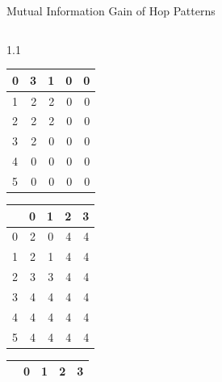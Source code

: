 \begin{alertblock}{Mutual Information Gain of Hop Patterns}
{\begin{column}{1.1\colwidth}
\begin{table}[]
\begin{subtable}{0.3\textwidth}
\begin{tabular}{|l|r|r|r|r|}
\hline
0 & \cellcolor{purple}3 & \cellcolor{white}1 & \cellcolor{gray}0 & \cellcolor{gray}0 \\ \hline
1 & \cellcolor{violet}2 & \cellcolor{violet}2 & \cellcolor{gray}0 & \cellcolor{gray}0 \\ \hline
2 & \cellcolor{violet}2 & \cellcolor{violet}2 & \cellcolor{gray}0 & \cellcolor{gray}0 \\ \hline
3 & \cellcolor{violet}2 & \cellcolor{gray}0 & \cellcolor{gray}0 & \cellcolor{gray}0 \\ \hline
4 & \cellcolor{gray}0 & \cellcolor{gray}0 & \cellcolor{gray}0 & \cellcolor{gray}0 \\ \hline
5 & \cellcolor{gray}0 & \cellcolor{gray}0 & \cellcolor{gray}0 & \cellcolor{gray}0 \\ \hline
\end{tabular}
\end{subtable}
\quad
\begin{subtable}{0.3\textwidth}
\centering
\begin{tabular}{|l|r|r|r|r|} 
\hline
\backslashbox{$\alpha$}{$\beta$} & 0 & 1 & 2 & 3  \\ 
\hline
0 & \cellcolor{purple}2 & \cellcolor{white}0 & \cellcolor{gray}4 & \cellcolor{gray}4 \\ \hline
1 & \cellcolor{purple}2 & \cellcolor{violet}1 & \cellcolor{gray}4 & \cellcolor{gray}4 \\ \hline
2 & \cellcolor{cyan}\cellcolor{cyan}3 & \cellcolor{cyan}3 & \cellcolor{gray}4 & \cellcolor{gray}4 \\ \hline
3 & \cellcolor{gray}4 & \cellcolor{gray}4 & \cellcolor{gray}4 & \cellcolor{gray}4 \\ \hline
4 & \cellcolor{gray}4 & \cellcolor{gray}4 & \cellcolor{gray}4 & \cellcolor{gray}4 \\ \hline
5 & \cellcolor{gray}4 & \cellcolor{gray}4 & \cellcolor{gray}4 & \cellcolor{gray}4 \\ \hline
\end{tabular}
\end{subtable}
\quad
\begin{subtable}{0.3\textwidth}
\centering
\begin{tabular}{|l|r|r|r|r|}
\hline
\backslashbox{$\alpha$}{$\beta$} & 0 & 1 & 2 & 3 \\ \hline

\end{tabular}
\end{subtable}
\end{table}
\end{column}}
\end{alertblock}
